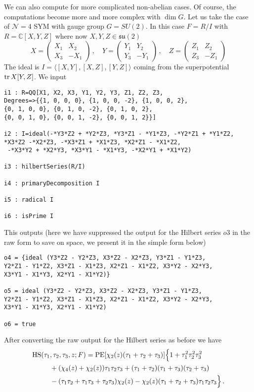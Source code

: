 \documentclass[main.tex]{subfiles}
\begin{document}
We can also compute for more complicated non-abelian cases. Of course, the computations become more and more complex with $\dim G$. Let us take the case of $\mathcal{N}=4$ SYM with gauge group $G=SU(2)$. In this case $F=R/I$ with $R=\mathbb{C}[X,Y,Z]$ where now $X,Y,Z\in\mathfrak{su}(2)$
\begin{equation}
X=\begin{pmatrix}
X_1&X_2\\X_3&-X_1
\end{pmatrix}\,,\quad Y=\begin{pmatrix}
Y_1&Y_2\\Y_3&-Y_1
\end{pmatrix}\,,\quad Z=\begin{pmatrix}
Z_1&Z_2\\Z_3&-Z_1
\end{pmatrix}
\end{equation}
The ideal is $I=\langle[X,Y],[X,Z],[Y,Z]\rangle$ coming from the superpotential $\operatorname{tr} X[Y,Z]$. We input
\begin{verbatim}
i1 : R=QQ[X1, X2, X3, Y1, Y2, Y3, Z1, Z2, Z3,
Degrees=>{{1, 0, 0, 0}, {1, 0, 0, -2}, {1, 0, 0, 2}, 
{0, 1, 0, 0}, {0, 1, 0, -2}, {0, 1, 0, 2}, 
{0, 0, 1, 0}, {0, 0, 1, -2}, {0, 0, 1, 2}}]

i2 : I=ideal(-*Y3*Z2 + *Y2*Z3, *Y3*Z1 - *Y1*Z3, -*Y2*Z1 + *Y1*Z2, 
*X3*Z2 -*X2*Z3, -*X3*Z1 + *X1*Z3, *X2*Z1 - *X1*Z2,
 -*X3*Y2 + *X2*Y3, *X3*Y1 - *X1*Y3, -*X2*Y1 + *X1*Y2)

i3 : hilbertSeries(R/I)

i4 : primaryDecomposition I

i5 : radical I

i6 : isPrime I

\end{verbatim}
This outputs (here we have suppressed the output for the Hilbert series $o3$ in the raw form to save on space, we present it in the simple form below)
\begin{verbatim}
o4 = {ideal (Y3*Z2 - Y2*Z3, X3*Z2 - X2*Z3, Y3*Z1 - Y1*Z3, 
Y2*Z1 - Y1*Z2, X3*Z1 - X1*Z3, X2*Z1 - X1*Z2, X3*Y2 - X2*Y3, 
X3*Y1 - X1*Y3, X2*Y1 - X1*Y2)}

o5 = ideal (Y3*Z2 - Y2*Z3, X3*Z2 - X2*Z3, Y3*Z1 - Y1*Z3, 
Y2*Z1 - Y1*Z2, X3*Z1 - X1*Z3, X2*Z1 - X1*Z2, X3*Y2 - X2*Y3, 
X3*Y1 - X1*Y3, X2*Y1 - X1*Y2)
     
o6 = true     
\end{verbatim}
After converting the raw output for the Hilbert series as before we have
\begin{equation}
\begin{aligned}
\textrm{HS}(\tau_1&,\tau_2,\tau_3,z;F)=\operatorname{\mathrm{PE}}[\chi_2(z)(\tau_1+\tau_2+\tau_3)]\Big\{1+\tau_1^2\tau_2^2\tau_3^2\\
&+(\chi_4(z)+\chi_2(z))\tau_1\tau_2\tau_3+(\tau_1+\tau_2)(\tau_1+\tau_3)(\tau_2+\tau_3)\\
&-(\tau_1\tau_2+\tau_1\tau_3+\tau_2\tau_3)\chi_2(z)-\chi_2(z)(\tau_1+\tau_2+\tau_3)\tau_1\tau_2\tau_3\Big\}\,.
\end{aligned}
\end{equation}
\end{document}
